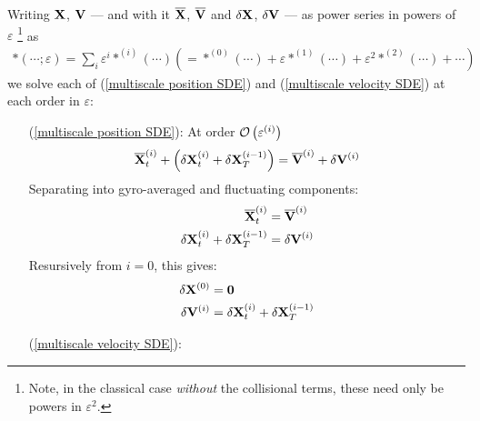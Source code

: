     Writing $\mathbf{X}$, $\mathbf{V}$ — and with it $\overline{\mathbf{X}}$, $\overline{\mathbf{V}}$ and $\delta\mathbf{X}$, $\delta\mathbf{V}$ — as power series in powers of $\varepsilon$ \footnote{Note, in the classical case \emph{without} the collisional terms, these need only be powers in $\varepsilon^{2}$.} as
    \begin{align}
        *(\cdots; \varepsilon)  =  \sum_{i}\varepsilon^{i}*^{(i)}(\cdots)  \left(=  *^{(0)}(\cdots) + \varepsilon*^{(1)}(\cdots) + \varepsilon^{2}*^{(2)}(\cdots) + \cdots\right)
    \end{align}
    we solve each of (\ref{multiscale position SDE}) and (\ref{multiscale velocity SDE}) at each order in $\varepsilon$: 
    \begin{itemize}
        \item[(\ref{multiscale position SDE}):]  At order $\mathcal{O}\left(\varepsilon^{(i)}\right)$
        \begin{equation}
            \overline{\mathbf{X}}^{(i)}_{t} + \left(\delta\mathbf{X}^{(i)}_{t} + \delta\mathbf{X}^{(i - 1)}_{T}\right)  =  \overline{\mathbf{V}}^{(i)} + \delta\mathbf{V}^{(i)}
        \end{equation}
        Separating into gyro-averaged and fluctuating components:
        \begin{align}
            \overline{\mathbf{X}}^{(i)}_{t}  &=  \overline{\mathbf{V}}^{(i)}  \\
            \delta\mathbf{X}^{(i)}_{t} + \delta\mathbf{X}^{(i - 1)}_{T}  &=  \delta\mathbf{V}^{(i)}
        \end{align}
        Resursively from $i = 0$, this gives:
        \begin{align}
            \delta\mathbf{X}^{(0)}  &=  \mathbf{0}  \\
            \delta\mathbf{V}^{(i)}  &=  \delta\mathbf{X}^{(i)}_{t} + \delta\mathbf{X}^{(i - 1)}_{T}
        \end{align}
        
        
        \item[(\ref{multiscale velocity SDE}):]
    \end{itemize}